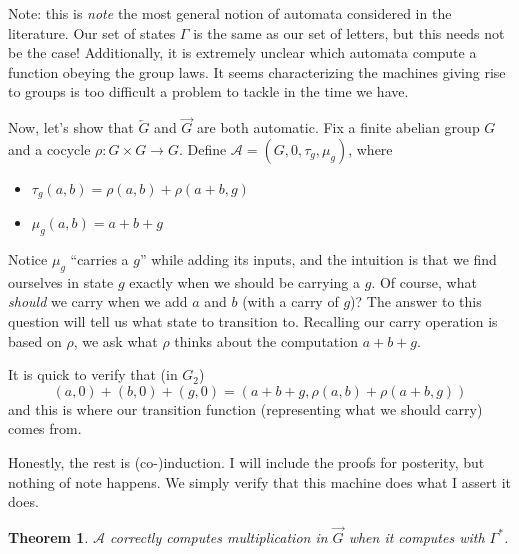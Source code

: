 \documentclass[12pt]{article}
\newtheorem{thm}{Theorem}
\theoremstyle{definition}
\begin{document}
  Note: this is \emph{note} the most general notion of automata considered
  in the literature. Our set of states $\Gamma$ is the same as our set of
  letters, but this needs not be the case! Additionally, 
  it is extremely unclear which automata compute a function obeying the 
  group laws. It seems characterizing the machines giving rise to groups is
  too difficult a problem to tackle in the time we have.

  \bigskip

  Now, let's show that $\overleftarrow{G}$ and $\overrightarrow{G}$ are both
  automatic. Fix a finite abelian group $G$ and a cocycle $\rho : G \times G \to G$.
  Define $\mathcal{A} = (G, 0, \tau_g, \mu_g)$, where

  \begin{itemize}
    \item $\tau_g(a,b) = \rho(a,b) + \rho(a+b,g)$ 
    \item $\mu_g(a,b) = a + b + g$
  \end{itemize}

  Notice $\mu_g$ ``carries a $g$'' while adding its inputs, 
  and the intuition is that we find ourselves in state $g$ 
  exactly when we should be carrying a $g$. 
  Of course, what \emph{should} we carry when we add $a$ and $b$
  (with a carry of $g$)? The answer to this question will tell us
  what state to transition to. Recalling our carry operation is based
  on $\rho$, we ask what $\rho$ thinks about the computation $a+b+g$.

  It is quick to verify that (in $G_2$)
  \[ (a,0) + (b,0) + (g,0) = (a+b+g, \rho(a,b) + \rho(a+b,g)) \]
  and this is where our transition function 
  (representing what we should carry) comes from.

  \bigskip

  Honestly, the rest is (co-)induction. I will include the proofs for 
  posterity, but nothing of note happens. We simply verify that this machine
  does what I assert it does.

  \begin{thm}
    $\mathcal{A}$ correctly computes multiplication in $\overrightarrow{G}$
    when it computes with $\Gamma^*$.
  \end{thm}
\end{document}

